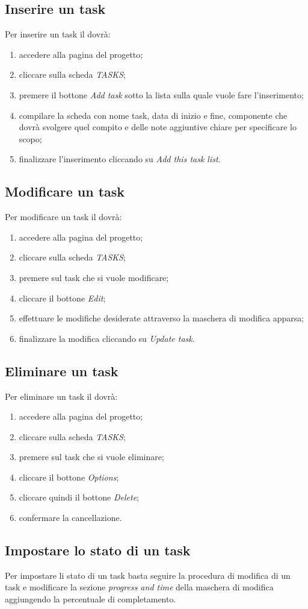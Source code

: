 		\subsection{Inserire un task}
			Per inserire un task il  dovrà:
			\begin{enumerate}
				\item accedere alla pagina del progetto;
				\item cliccare sulla scheda \textit{TASKS};
				\item premere il bottone \textit{Add task} sotto la lista sulla quale vuole fare l'inserimento;
				\item compilare la scheda con nome task, data di inizio e fine, componente che dovrà svolgere quel compito e delle note aggiuntive chiare per specificare lo scopo;
				\item finalizzare l'inserimento cliccando su \textit{Add this task list}.
			\end{enumerate}
			
		\subsection{Modificare un task}
			Per modificare un task il  dovrà:
			\begin{enumerate}
				\item accedere alla pagina del progetto;
				\item cliccare sulla scheda \textit{TASKS};
				\item premere sul task che si vuole modificare;
				\item cliccare il bottone \textit{Edit};
				\item effettuare le modifiche desiderate attraverso la maschera di modifica apparsa;
				\item finalizzare la modifica cliccando su \textit{Update task}.
			\end{enumerate}
			
		\subsection{Eliminare un task}
			Per eliminare un task il  dovrà:
			\begin{enumerate}
				\item accedere alla pagina del progetto;
				\item cliccare sulla scheda \textit{TASKS};
				\item premere sul task che si vuole eliminare;
				\item cliccare il bottone \textit{Options};
				\item cliccare quindi il bottone \textit{Delete};
				\item confermare la cancellazione.
			\end{enumerate}
			
		\subsection{Impostare lo stato di un task}
			Per impostare li stato di un task basta  seguire la procedura di modifica di un task e modificare la sezione \textit{progress and time} della maschera di modifica aggiungendo la percentuale di completamento.